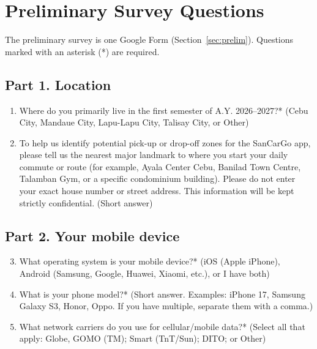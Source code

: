 \chapter{Preliminary Survey Questions}
\label{app:prelim}
\clearpage

The preliminary survey is one Google Form (Section~\ref{sec:prelim}). Questions marked with an asterisk (*) are required. 

\section*{Part 1. Location}
\begin{enumerate}
    \item Where do you primarily live in the first semester of A.Y. 2026--2027?* (Cebu City, Mandaue City, Lapu-Lapu City, Talisay City, or Other)
    \item To help us identify potential pick-up or drop-off zones for the SanCarGo app, please tell us the nearest major landmark to where you start your daily commute or route (for example, Ayala Center Cebu, Banilad Town Centre, Talamban Gym, or a specific condominium building). Please do not enter your exact house number or street address. This information will be kept strictly confidential. (Short answer)
\end{enumerate}

\section*{Part 2. Your mobile device}
\begin{enumerate}
    \setcounter{enumi}{2}
    \item What operating system is your mobile device?* (iOS (Apple iPhone), Android (Samsung, Google, Huawei, Xiaomi, etc.), or I have both)
    \item What is your phone model?* (Short answer. Examples: iPhone 17, Samsung Galaxy S3, Honor, Oppo. If you have multiple, separate them with a comma.)
    \item What network carriers do you use for cellular/mobile data?* (Select all that apply: Globe, GOMO (TM); Smart (TnT/Sun); DITO; or Other)
\end{enumerate}

